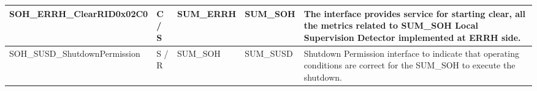 \begin{longtable}{|l|l|l|l|l|}
\begin{minipage}{0.39\linewidth}\raggedright\vspace{.75ex}SOH\_ERRH\_ClearRID0x02C0\vspace{.75ex}\end{minipage} & \begin{minipage}{0.07\linewidth}\raggedright\vspace{.75ex}C / S\vspace{.75ex}\end{minipage} & \begin{minipage}{0.11\linewidth}\raggedright\vspace{.75ex}SUM\_ERRH\vspace{.75ex}\end{minipage} & \begin{minipage}{0.11\linewidth}\raggedright\vspace{.75ex}SUM\_SOH\vspace{.75ex}\end{minipage} & \begin{minipage}{0.16\linewidth}\raggedright\vspace{.75ex}The interface provides service for starting clear, all the metrics related to SUM\_SOH Local Supervision Detector implemented at ERRH side.\vspace{.75ex}\end{minipage}\\\hline
\begin{minipage}{0.39\linewidth}\raggedright\vspace{.75ex}SOH\_SUSD\_ShutdownPermission\vspace{.75ex}\end{minipage} & \begin{minipage}{0.07\linewidth}\raggedright\vspace{.75ex}S / R\vspace{.75ex}\end{minipage} & \begin{minipage}{0.11\linewidth}\raggedright\vspace{.75ex}SUM\_SOH\vspace{.75ex}\end{minipage} & \begin{minipage}{0.11\linewidth}\raggedright\vspace{.75ex}SUM\_SUSD\vspace{.75ex}\end{minipage} & \begin{minipage}{0.16\linewidth}\raggedright\vspace{.75ex}Shutdown Permission interface to indicate that operating conditions are correct for the SUM\_SOH to execute the shutdown.\vspace{.75ex}\end{minipage}\\\hline
\end{longtable}